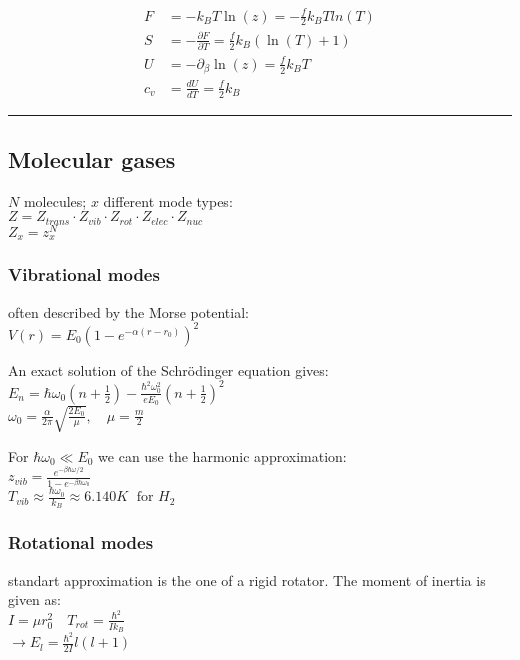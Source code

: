 \begin{equation*}
    \begin{aligned}
        F &= -k_B T \ln(z) = - \frac{f}{2} k_B T ln(T) \\
        S &= - \frac{\partial F}{\partial T} = \frac{f}{2} k_B (\ln(T)+1) \\
        U &= - \partial_\beta \ln (z) = \frac{f}{2} k_B T \\
        c_v &= \frac{dU}{dT} = \frac{f}{2} k_B
    \end{aligned}
\end{equation*}

\noindent\rule[1ex]{\textwidth/5}{0pt} %
\subsection*{Molecular gases}
$N$ molecules; $x$ different mode types: \\
$Z = Z_{trans} \cdot Z_{vib} \cdot Z_{rot} \cdot Z_{elec} \cdot Z_{nuc}$ \\
$Z_x = z_x^N$

\subsubsection*{Vibrational modes}
often described by the Morse potential:\\
$V(r) = E_0 \left(1- e^{-\alpha (r-r_0)}\right)^2$

An exact solution of the Schrödinger equation gives:\\
$E_n = \hbar \omega_0 \left(n + \frac{1}{2}\right) - \frac{\hbar^2 \omega_0^2}{e E_0} \left(n + \frac{1}{2}\right)^2$ \\
$\omega_0 = \frac{\alpha}{2 \pi} \sqrt{\frac{2 E_0}{\mu}} , \quad \mu = \frac{m}{2}$

For $\hbar \omega_0 \ll E_0 $ we can use the harmonic approximation:\\
$z_{vib} = \frac{e^{-\beta \hbar \omega /2}}{1- e^{- \beta \hbar \omega_0}}$\\
$T_{vib} \approx \frac{\hbar \omega_0}{k_B} \approx 6.140 K \; \text{ for } H_2$

\subsubsection*{Rotational modes}

standart approximation is the one of a rigid rotator. The moment of inertia is given as: \\
$I = \mu r_0^2 \quad T_{rot} = \frac{\hbar^2}{I k_B}$\\
$\rightarrow E_l = \frac{\hbar^2}{2I} l(l+1)$

